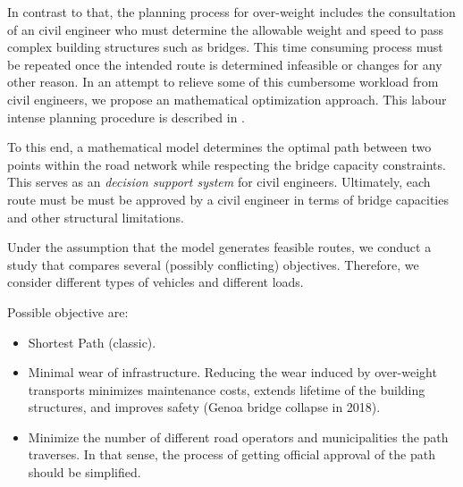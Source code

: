 In contrast to that, the planning process for over-weight includes the consultation
of an civil engineer who must determine the allowable weight and speed to pass
complex building structures such as bridges.
This time consuming process must be repeated once the intended route is determined infeasible or changes for any other reason.
In an attempt to relieve some of this cumbersome workload from civil engineers,
we propose an mathematical optimization approach.
This labour intense planning procedure is described in
\citet{Osegueda.1999}.

To this end, a mathematical model determines the optimal path between two
points within the road network while respecting the bridge capacity constraints.
This serves as an \textit{decision support system} for civil engineers.
Ultimately,  each route must be must be approved by a civil engineer  in terms of
bridge capacities and other structural limitations.

Under the assumption that the model generates feasible routes,
we conduct a study that compares several (possibly conflicting) objectives.
Therefore, we consider different types of vehicles and different loads.

Possible objective are:
\begin{itemize}
  \item Shortest Path (classic).

  \item Minimal wear of infrastructure. Reducing the wear induced by over-weight transports
  minimizes maintenance costs, extends lifetime of the building structures, and
  improves safety (Genoa bridge collapse in 2018).

  \item Minimize the number of different road operators and municipalities the path
  traverses. In that sense, the process of getting official approval of the
  path should be simplified.
\end{itemize}

